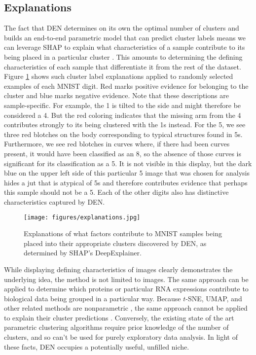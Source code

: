 \documentclass{article}
\begin{document}
\subsection{Explanations}

The fact that DEN determines on its own the optimal number of clusters and builds an end-to-end parametric model that can predict cluster labels means we can leverage SHAP to explain what characteristics of a sample contribute to its being placed in a particular cluster \cite{NIPS2017_7062}. This amounts to determining the defining characteristics of each sample that differentiate it from the rest of the dataset. Figure \ref{fig:explanations} shows such cluster label explanations applied to randomly selected examples of each MNIST digit. Red marks positive evidence for belonging to the cluster and blue marks negative evidence. Note that these descriptions are sample-specific. For example, the 1 is tilted to the side and might therefore be considered a 4. But the red coloring indicates that the missing arm from the 4 contributes strongly to its being clustered with the 1s instead. For the 5, we see three red blotches on the body corresponding to typical structures found in 5s. Furthermore, we see red blotches in curves where, if there had been curves present, it would have been classified as an 8, so the absence of those curves is significant for its classification as a 5. It is not visible in this display, but the dark blue on the upper left side of this particular 5 image that was chosen for analysis hides a jut that is atypical of 5s and therefore contributes evidence that perhaps this sample should not be a 5. Each of the other digits also has distinctive characteristics captured by DEN.

\begin{figure}[htp]
    \centering
    \texttt{[image: figures/explanations.jpg]}
    \caption{Explanations of what factors contribute to MNIST samples being placed into their appropriate clusters discovered by DEN, as determined by SHAP's DeepExplainer.}
    \label{fig:explanations}
\end{figure}

While displaying defining characteristics of images clearly demonstrates the underlying idea, the method is not limited to images. The same approach can be applied to determine which proteins or particular RNA expressions contribute to biological data being grouped in a particular way. Because $t$-SNE, UMAP, and other related methods are nonparametric \cite{maaten2008visualizing, 2018arXivUMAP}, the same approach cannot be applied to explain their cluster predictions \cite{NIPS2017_7062}. Conversely, the existing state of the art parametric clustering algorithms require prior knowledge of the number of clusters, and so can't be used for purely exploratory data analysis. In light of these facts, DEN occupies a potentially useful, unfilled niche.
\end{document}
